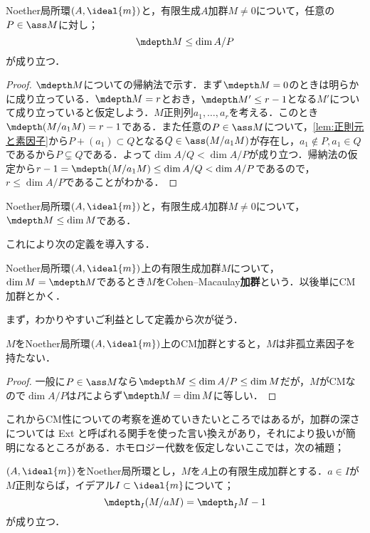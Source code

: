 \begin{prop}
	Noether局所環$(A,\ideal{m})$と，有限生成$A$加群$M\neq0$について，任意の$P\in\ass M$に対し；
	\[\mdepth M\leq\dim A/P\]
	が成り立つ．
\end{prop}

\begin{proof}
	$\mdepth M$についての帰納法で示す．まず$\mdepth M=0$のときは明らかに成り立っている．$\mdepth M=r$とおき，$\mdepth M'\leq r-1$となる$M'$について成り立っていると仮定しよう．$M$正則列$a_1,\dots,a_r$を考える．このとき$\mdepth (M/a_1M)=r-1$である．また任意の$P\in\ass M$について，\ref{lem:正則元と素因子}から$P+(a_1)\subset Q$となる$Q\in\ass (M/a_1M)$が存在し，$a_1\not\in P,a_1\in Q$であるから$P\subsetneq Q$である．よって$\dim A/Q<\dim A/P$が成り立つ．帰納法の仮定から$r-1=\mdepth (M/a_1M)\leq\dim A/Q<\dim A/P$であるので，$r\leq\dim A/P$であることがわかる． 
\end{proof}

\begin{cor}
	Noether局所環$(A,\ideal{m})$と，有限生成$A$加群$M\neq0$について，$\mdepth M\leq\dim M$である．
\end{cor}

これにより次の定義を導入する．

\begin{defi}
	Noether局所環$(A,\ideal{m})$上の有限生成加群$M$について，$\dim M=\mdepth M$であるとき$M$をCohen--Macaulay\textbf{加群}という．以後単にCM加群とかく．
\end{defi}

まず，わかりやすいご利益として定義から次が従う．

\begin{prop}\label{prop:CM加群は非孤立素因子を持たない}
	$M$をNoether局所環$(A,\ideal{m})$上のCM加群とすると，$M$は非孤立素因子を持たない．
\end{prop}

\begin{proof}
	一般に$P\in\ass M$なら$\mdepth M\leq\dim A/P\leq\dim M$だが，$M$がCMなので$\dim A/P$は$P$によらず$\mdepth M=\dim M$に等しい．
\end{proof}
これからCM性についての考察を進めていきたいところではあるが，加群の深さについては Ext と呼ばれる関手を使った言い換えがあり，それにより扱いが簡明になるところがある．ホモロジー代数を仮定しないここでは，次の補題；

\begin{lem}\label{lem:depth M/aM=depth M-1}
	$(A,\ideal{m})$をNoether局所環とし，$M$を$A$上の有限生成加群とする．$a\in I$が$M$正則ならば，イデアル$I\subset\ideal{m}$について；
	\[\mdepth_I (M/aM)=\mdepth_I M-1\]
	が成り立つ．
\end{lem}


